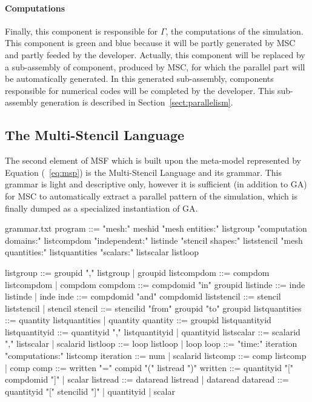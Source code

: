 \paragraph{\textbf{Computations}}
Finally, this component is responsible for $\Gamma$, \ie the computations of the simulation. This component is green and blue because it will be partly generated by MSC and partly feeded by the developer. Actually, this component will be replaced by a sub-assembly of component, produced by MSC, for which the parallel part will be automatically generated. In this generated sub-assembly, components responsible for numerical codes will be completed by the developer. This sub-assembly generation is described in Section~\ref{sect:parallelism}.

\subsection{The Multi-Stencil Language}

The second element of MSF which is built upon the meta-model represented by Equation (~\ref{eq:msp}) is the Multi-Stencil Language and its grammar. This grammar is light and descriptive only, however it is sufficient (in addition to GA) for MSC to automatically extract a parallel pattern of the simulation, which is finally dumped as a specialized instantiation of GA.

\begin{filecontents*}{grammar.txt}
program ::= "mesh:" meshid 
            "mesh entities:" listgroup
            "computation domains:" listcompdom
            "independent:" listinde
            "stencil shapes:" liststencil
            "mesh quantities:" listquantities
            "scalars:" listscalar
            listloop

listgroup ::= groupid "," listgroup | groupid
listcompdom ::= compdom listcompdom | compdom
compdom ::= compdomid "in" groupid
listinde ::= inde listinde | inde
inde ::= compdomid "and" compdomid
liststencil ::= stencil liststencil | stencil
stencil ::= stencilid "from" groupid "to" groupid
listquantities ::= quantity listquantities |  quantity
quantity ::= groupid listquantityid
listquantityid ::= quantityid "," listquantityid |  quantityid
listscalar ::= scalarid "," listscalar | scalarid
listloop ::= loop listloop | loop
loop ::=  "time:" iteration
          "computations:" listcomp
iteration ::= num | scalarid
listcomp ::= comp listcomp |  comp
comp ::= written "=" compid "(" listread ")"
written ::= quantityid "[" compdomid "]" | scalar
listread ::= dataread listread | dataread
dataread ::= quantityid "[" stencilid "]" |  quantityid | scalar
\end{filecontents*}

